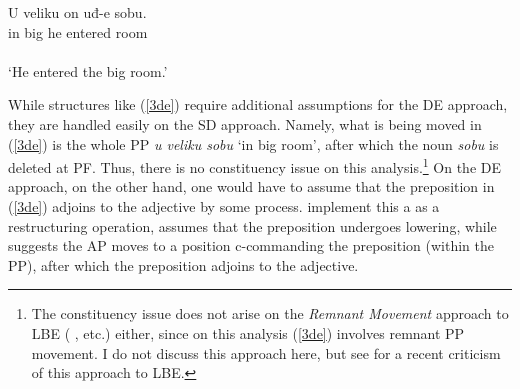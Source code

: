 \documentclass[
    output=paper,
    colorlinks,
    citecolor=brown,
]{langscibook}
\begin{document}
\begin{exe}
\ex \label{3de}
\gll U veliku on uđ-e   sobu. \hspace{38mm} \citep[78]{Bošković2005}\\
in big he entered room\\\\
‘He entered the big room.’
\end{exe}

While structures like (\ref{3de}) require additional assumptions for the DE approach, they are handled easily on the SD approach. Namely, what is being moved in (\ref{3de}) is the whole PP \textit{u veliku sobu} ‘in big room’, after which the noun \textit{sobu} is deleted at PF. Thus, there is no constituency issue on this analysis.\footnote{The constituency issue does not arise on the \textit{Remnant Movement} approach to LBE (\citeauthor{FranksProgovac1994} \citeyear{FranksProgovac1994}, \citeauthor{bavsic2005nominal} \citeyear{bavsic2005nominal} etc.) either, since on this analysis (\ref{3de}) involves remnant PP movement. I do not discuss this approach here, but see \citet{murphy2020left} for a recent criticism of this approach to LBE. } On the DE approach, on the other hand, one would have to assume that the preposition in (\ref{3de}) adjoins to the adjective by some process. \citet{BorsleyJaworska1988} implement this a as a restructuring operation, \citet{Corver1992} assumes that the preposition undergoes lowering, while \citet{Bošković2005} suggests the AP moves to a position c-commanding the preposition (within the PP), after which the preposition adjoins to the adjective. 
\end{document}
